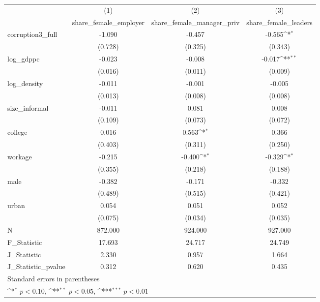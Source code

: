 {
\def\sym#1{\ifmmode^{#1}\else\(^{#1}\)\fi}
\begin{tabular}{l*{3}{c}}
\hline\hline
            &\multicolumn{1}{c}{(1)}&\multicolumn{1}{c}{(2)}&\multicolumn{1}{c}{(3)}\\
            &\multicolumn{1}{c}{share\_female\_employer}&\multicolumn{1}{c}{share\_female\_manager\_priv}&\multicolumn{1}{c}{share\_female\_leaders}\\
\hline
corruption3\_full&      -1.090         &      -0.457         &      -0.565\sym{*}  \\
            &     (0.728)         &     (0.325)         &     (0.343)         \\
[1em]
log\_gdppc   &      -0.023         &      -0.008         &      -0.017\sym{**} \\
            &     (0.016)         &     (0.011)         &     (0.009)         \\
[1em]
log\_density &      -0.011         &      -0.001         &      -0.005         \\
            &     (0.013)         &     (0.008)         &     (0.008)         \\
[1em]
size\_informal&      -0.011         &       0.081         &       0.008         \\
            &     (0.109)         &     (0.073)         &     (0.072)         \\
[1em]
college     &       0.016         &       0.563\sym{*}  &       0.366         \\
            &     (0.403)         &     (0.311)         &     (0.250)         \\
[1em]
workage     &      -0.215         &      -0.400\sym{*}  &      -0.329\sym{*}  \\
            &     (0.355)         &     (0.218)         &     (0.188)         \\
[1em]
male        &      -0.382         &      -0.171         &      -0.332         \\
            &     (0.489)         &     (0.515)         &     (0.421)         \\
[1em]
urban       &       0.054         &       0.051         &       0.052         \\
            &     (0.075)         &     (0.034)         &     (0.035)         \\
\hline
N           &     872.000         &     924.000         &     927.000         \\
F\_Statistic &      17.693         &      24.717         &      24.749         \\
J\_Statistic &       2.330         &       0.957         &       1.664         \\
J\_Statistic\_pvalue&       0.312         &       0.620         &       0.435         \\
\hline\hline
\multicolumn{4}{l}{\footnotesize Standard errors in parentheses}\\
\multicolumn{4}{l}{\footnotesize \sym{*} \(p<0.10\), \sym{**} \(p<0.05\), \sym{***} \(p<0.01\)}\\
\end{tabular}
}
